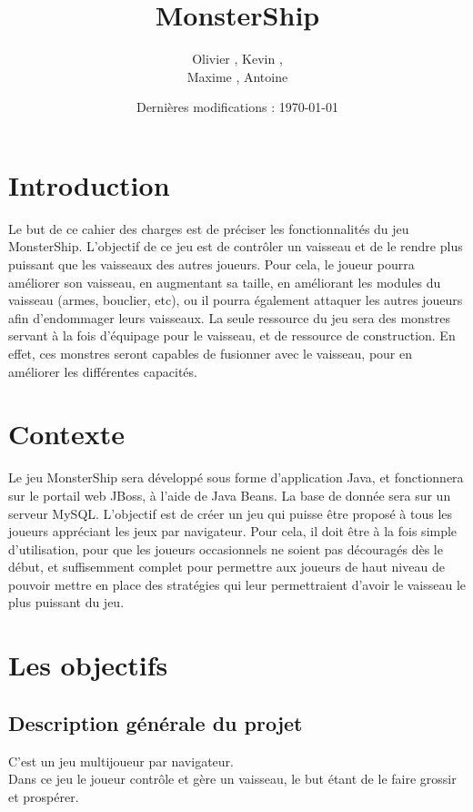 \documentclass[a4paper,11pt]{report}
\title{MonsterShip}
\author{Olivier \bsc{Boissard}, Kevin \bsc{Boulala},\\
Maxime \bsc{Dubois}, Antoine \bsc{Lavier}}
\date{Dernières modifications : \today}
\begin{document}
\maketitle
\setcounter{tocdepth}{1}
\tableofcontents

\chapter{Introduction}
    Le but de ce cahier des charges est de préciser les fonctionnalités du jeu MonsterShip. L'objectif de ce jeu est de contrôler un vaisseau et de le rendre plus puissant que les vaisseaux des autres joueurs. Pour cela, le joueur pourra améliorer son vaisseau, en augmentant sa taille, en améliorant les modules du vaisseau (armes, bouclier, etc), ou il pourra également attaquer les autres joueurs afin d’endommager leurs vaisseaux. La seule ressource du jeu sera des monstres servant à la fois d’équipage pour le vaisseau, et de ressource de construction. En effet, ces monstres seront capables de fusionner avec le vaisseau, pour en améliorer les différentes capacités.

\chapter{Contexte}
    Le jeu MonsterShip sera développé sous forme d’application Java, et fonctionnera sur le portail web JBoss, à l’aide de Java Beans. La base de donnée sera sur un serveur MySQL. L’objectif est de créer un jeu qui puisse être proposé à tous les joueurs appréciant les jeux par navigateur. Pour cela, il doit être à la fois simple d’utilisation, pour que les joueurs occasionnels ne soient pas découragés dès le début, et suffisemment complet pour permettre aux joueurs de haut niveau de pouvoir mettre en place des stratégies qui leur permettraient d’avoir le vaisseau le plus puissant du jeu.

\chapter{Les objectifs}
    \section{Description générale du projet}
    C'est un jeu multijoueur par navigateur.\\

    Dans ce jeu le joueur contrôle et gère un vaisseau, le but étant de le faire grossir et prospérer.\\
\end{document}
